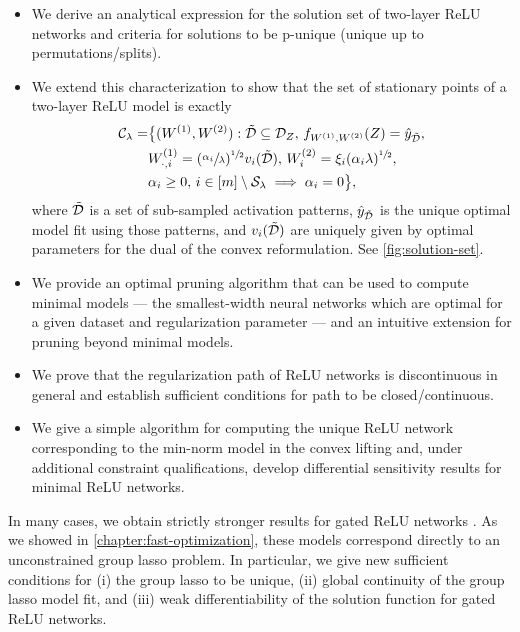 \begin{itemize}
    \item We derive an analytical expression for the solution set of two-layer
          ReLU networks and criteria for solutions to be p-unique (unique up to
          permutations/splits).

    \item We extend this characterization to show that the set of
          stationary points of a two-layer ReLU model is exactly
          \begin{equation}\label{eq:stationary-points}
              \begin{aligned}
                  \mathcal{C}_\lambda =
                   & \big\{
                  (W^{(1)},  W^{(2)}) : \tilde {\mathcal{D}}  \subseteq  \mathcal{D}_Z,
                  \, f_{W^{(1)}, W^{(2)}}(Z)  =  \hat y_{\tilde {\mathcal{D}}},                                      \\
                   & W^{(1)}_{\cdot, i} = (\sfrac{\alpha_{i}}{\lambda})^{\sfrac{1}{2}} v_i(\tilde {\mathcal{D}}), \,
                  W^{(2)}_{i} = \xi_i(\alpha_i \lambda)^{\sfrac{1}{2}},                                      \\
                   & \alpha_i \geq 0, \, i \in [m] \setminus \mathcal{S}_\lambda \implies \alpha_i = 0
                  \big\},
              \end{aligned}
          \end{equation}
          where \( \tilde {\mathcal{D}} \) is a set of sub-sampled activation patterns,
          \( \hat y_{\tilde {\mathcal{D}}} \) is the unique optimal model fit using
          those patterns, and \( v_i(\tilde {\mathcal{D}}) \) are uniquely given by optimal
          parameters for the dual of the convex reformulation.
          See \cref{fig:solution-set}.

    \item We provide an optimal pruning algorithm that can be used to compute
          minimal models --- the smallest-width neural networks which are optimal
          for a given dataset and regularization parameter --- and an intuitive
          extension for pruning beyond minimal models.

    \item We prove that the regularization path of ReLU networks is discontinuous
          in general and establish sufficient conditions for path to be
          closed/continuous.

    \item We give a simple algorithm for computing the unique ReLU network
          corresponding to the min-norm model in the convex lifting and,
          under additional constraint qualifications, develop differential
          sensitivity
          results for minimal ReLU networks.
\end{itemize}
In many cases, we obtain strictly stronger results for gated ReLU networks
\citep{fiat2019decoupling}.
As we showed in \cref{chapter:fast-optimization}, these models correspond
directly to an unconstrained group lasso problem.
In particular, we give new sufficient conditions for (i) the group lasso
to be unique, (ii) global continuity of the group lasso model fit, and (iii)
weak differentiability of the solution function for gated ReLU networks.

